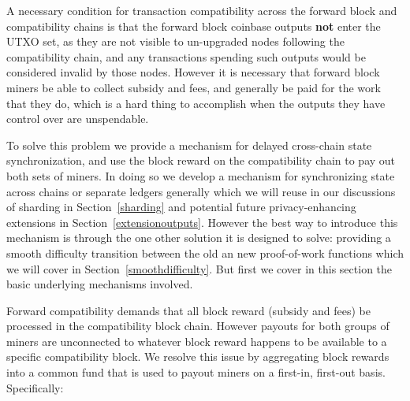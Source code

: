 A necessary condition for transaction compatibility across the forward
block and compatibility chains is that the forward block coinbase
outputs \textbf{not} enter the UTXO set, as they are not visible to
un-upgraded nodes following the compatibility chain, and any
transactions spending such outputs would be considered invalid by
those nodes.  However it is necessary that forward block miners be
able to collect subsidy and fees, and generally be paid for the work
that they do, which is a hard thing to accomplish when the outputs
they have control over are unspendable.

To solve this problem we provide a mechanism for delayed cross-chain
state synchronization, and use the block reward on the compatibility
chain to pay out both sets of miners.  In doing so we develop a
mechanism for synchronizing state across chains or separate ledgers
generally which we will reuse in our discussions of sharding in
Section~\ref{sharding} and potential future privacy-enhancing
extensions in Section~\ref{extensionoutputs}.  However the best way to
introduce this mechanism is through the one other solution it is
designed to solve: providing a smooth difficulty transition between
the old an new proof-of-work functions which we will cover in
Section~\ref{smoothdifficulty}.  But first we cover in this section
the basic underlying mechanisms involved.

Forward compatibility demands that all block reward (subsidy and fees)
be processed in the compatibility block chain.  However payouts for
both groups of miners are unconnected to whatever block reward happens
to be available to a specific compatibility block.  We resolve this
issue by aggregating block rewards into a common fund that is used to
payout miners on a first-in, first-out basis.  Specifically:

